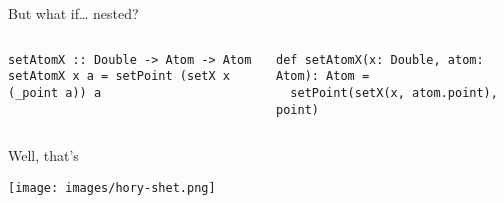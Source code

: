 \documentclass[presentation,aspectratio=169,8pt]{beamer}
\begin{document}
\begin{frame}[label={sec:org99a5ffb},fragile]{But what if\ldots{} nested?}
 \begin{columns}
\begin{column}{0.5\columnwidth}
\begin{verbatim}
setAtomX :: Double -> Atom -> Atom
setAtomX x a = setPoint (setX x (_point a)) a
\end{verbatim}
\end{column}

\begin{column}{0.5\columnwidth}
\begin{verbatim}
def setAtomX(x: Double, atom: Atom): Atom =
  setPoint(setX(x, atom.point), point)
\end{verbatim}
\end{column}
\end{columns}
\end{frame}

\begin{frame}[label={sec:org77ccaf7}]{Well, that's}
\begin{center}
\texttt{[image: images/hory-shet.png]}
\end{center}
\end{frame}
\end{document}
